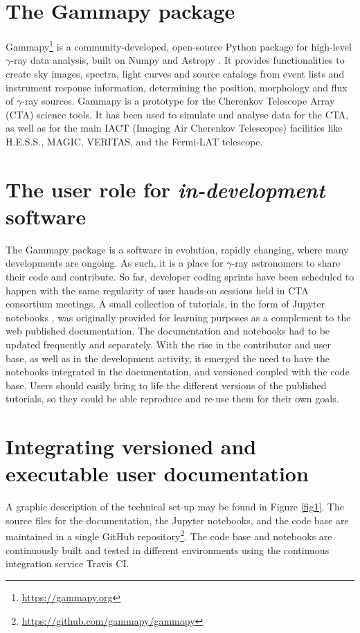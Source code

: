 \documentclass[11pt,twoside]{article}
\begin{document}
\section{The Gammapy package}

Gammapy\footnote{\url{https://gammapy.org}} \citep{2017ascl.soft11014D} is a community-developed, open-source Python package for high-level $\gamma$-ray data analysis, built on Numpy \citep{oliphant_guide_2006} and Astropy \citep{2013ascl.soft04002G}. It provides functionalities to create sky images, spectra, light curves and source catalogs from event lists and instrument response information, determining the position, morphology and flux of $\gamma$-ray sources. Gammapy is a prototype for the Cherenkov Telescope Array (CTA) science tools. It has been used to simulate and analyse data for the CTA, as well as for the main IACT (Imaging Air Cherenkov Telescopes) facilities like H.E.S.S., MAGIC, VERITAS,  and the Fermi-LAT telescope.  

\section{The user role for \textit{in-development} software}

The Gammapy package is a software in evolution, rapidly changing, where many developments are ongoing. As such, it is a place for $\gamma$-ray astronomers to share their code and contribute. So far, developer coding sprints have been scheduled to happen with the same regularity of user hands-on sessions held in CTA consortium meetings. A small collection of tutorials, in the form of Jupyter notebooks \citep{Kluyver:2016aa}, was originally provided for learning purposes as a complement to the web published documentation. The documentation and notebooks had to be updated frequently and separately. With the rise in the contributor and user base, as well as in the development activity, it emerged the need to have the notebooks integrated in the documentation, and versioned coupled with the code base. Users should easily bring to life the different versions of the published tutorials, so they could be able reproduce and re-use them for their own goals.

\section{Integrating versioned and executable user documentation}

A graphic description of the technical set-up may be found in Figure \ref{fig1}. The source files for the documentation, the Jupyter notebooks, and the code base are maintained in a single GitHub repository\footnote{\url{https://github.com/gammapy/gammapy}}. The code base and notebooks are continuously built and tested in different environments using the continuous integration service Travis CI.
\end{document}
